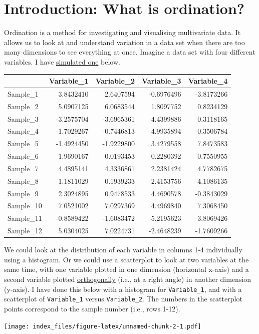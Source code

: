 \documentclass[]{article}
\begin{document}
\hypertarget{introduction-what-is-ordination}{%
\section{Introduction: What is
ordination?}\label{introduction-what-is-ordination}}

Ordination is a method for investigating and visualising multivariate
data. It allows us to look at and understand variation in a data set
when there are too many dimensions to see everything at once. Imagine a
data set with four different variables. I have
\href{https://StirlingCodingClub.github.io/simulating_data/index.html}{simulated
one} below.

\begin{longtable}[]{@{}lrrrr@{}}
\toprule
& Variable\_1 & Variable\_2 & Variable\_3 & Variable\_4\tabularnewline
\midrule
\endhead
Sample\_1 & 3.8432410 & 2.6407594 & -0.6976496 &
-3.8173266\tabularnewline
Sample\_2 & 5.0907125 & 6.0683544 & 1.8097752 & 0.8234129\tabularnewline
Sample\_3 & -3.2575704 & -3.6965361 & 4.4399886 &
0.3118165\tabularnewline
Sample\_4 & -1.7029267 & -0.7446813 & 4.9935894 &
-0.3506784\tabularnewline
Sample\_5 & -1.4924450 & -1.9229800 & 3.4279558 &
7.8473583\tabularnewline
Sample\_6 & 1.9690167 & -0.0193453 & -0.2280392 &
-0.7550955\tabularnewline
Sample\_7 & 4.4895141 & 4.3336861 & 2.2381424 & 4.7782675\tabularnewline
Sample\_8 & 1.1811029 & -0.1939233 & -2.4153756 &
4.1086135\tabularnewline
Sample\_9 & 2.3024895 & 0.9478533 & 4.4690578 &
-0.3843029\tabularnewline
Sample\_10 & 7.0521002 & 7.0297369 & 4.4969840 &
7.3068450\tabularnewline
Sample\_11 & -0.8589422 & -1.6083472 & 5.2195623 &
3.8069426\tabularnewline
Sample\_12 & 5.0304025 & 7.0224731 & -2.4648239 &
-1.7609266\tabularnewline
\bottomrule
\end{longtable}

We could look at the distribution of each variable in columns 1-4
individually using a histogram. Or we could use a scatterplot to look at
two variables at the same time, with one variable plotted in one
dimension (horizontal x-axis) and a second variable plotted
\href{https://en.wikipedia.org/wiki/Orthogonality}{orthogonally} (i.e.,
at a right angle) in another dimension (y-axis). I have done this below
with a histogram for \texttt{Variable\_1}, and with a scatterplot of
\texttt{Variable\_1} versus \texttt{Variable\_2}. The numbers in the
scatterplot points correspond to the sample number (i.e., rows 1-12).

\texttt{[image: index\_files/figure-latex/unnamed-chunk-2-1.pdf]}
\end{document}

